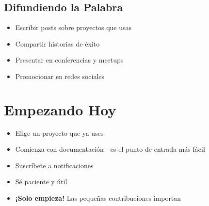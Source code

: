 \documentclass{presentacion}
\begin{document}
\subsection{Difundiendo la Palabra}
\begin{frame}
    \begin{itemize}[<+->]
        \item Escribir posts sobre proyectos que usas
        \item Compartir historias de éxito
        \item Presentar en conferencias y meetups
        \item Promocionar en redes sociales
    \end{itemize}
    
    \vspace{1em}
\end{frame}

\section{Empezando Hoy}

\begin{frame}
    \begin{itemize}[<+->]
        \item Elige un proyecto que ya uses
        \item Comienza con documentación - es el punto de entrada más fácil
        \item Suscríbete a notificaciones
        \item Sé paciente y útil
        \item \textbf{¡Solo empieza!} Las pequeñas contribuciones importan
    \end{itemize}
    
    \vspace{2em}
\end{frame}

\usebackgroundtemplate{}%
\end{document}
